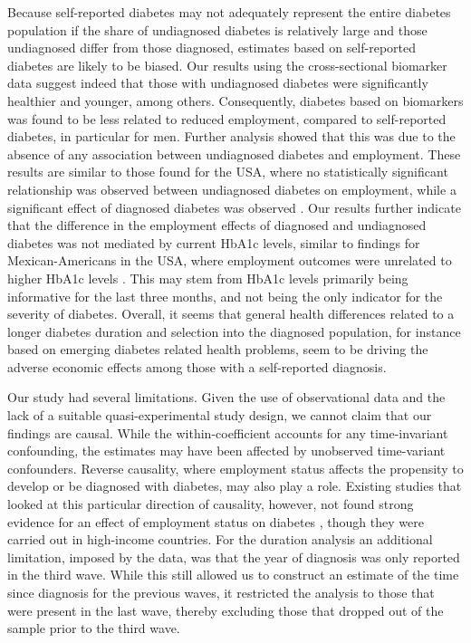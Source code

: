 \documentclass[10pt,letterpaper]{article}
\begin{document}
Because self-reported diabetes may not adequately represent the entire diabetes population if the share of undiagnosed diabetes is relatively large and those undiagnosed differ from those diagnosed, estimates based on self-reported diabetes are likely to be biased. Our results using the cross-sectional biomarker data suggest indeed that  those with undiagnosed diabetes were significantly healthier and younger, among others. Consequently, diabetes based on biomarkers was found to be less related to reduced employment, compared to self-reported diabetes, in particular for men. Further analysis showed that this was due to the absence of any association between undiagnosed diabetes and employment. These results are similar to those found for the USA, where no statistically significant relationship was observed between undiagnosed diabetes on employment, while a significant effect of diagnosed diabetes was observed \cite{Minor2015}. Our results further indicate that the  difference in the employment effects of diagnosed and undiagnosed diabetes was not mediated by current \ac{HbA1c} levels, similar to findings for Mexican-Americans in the USA, where employment outcomes were unrelated to higher \ac{HbA1c} levels \cite{BrownIII2011}. This may stem from \ac{HbA1c} levels primarily being informative for the last three months, and not being the only indicator for the severity of diabetes. Overall, it seems that general health differences related to a longer diabetes duration and selection into the diagnosed population, for instance based on emerging diabetes related health problems, seem to be driving the adverse economic effects among those with a self-reported diagnosis.

Our study had several limitations. Given the use of observational data and the lack of a suitable quasi-experimental study design, we cannot claim that our findings are causal. While the within-coefficient accounts for any time-invariant confounding, the estimates may have been affected by unobserved time-variant confounders. Reverse causality, where employment status affects the propensity to develop or be diagnosed with diabetes, may also play a role. Existing studies that looked at this particular direction of causality, however, not found strong evidence for an effect of employment status on diabetes \cite{Bergemann2011,Schaller2015}, though they were carried out in high-income countries. For the duration analysis an additional limitation, imposed by the data, was that the year of diagnosis was only reported in the third wave. While this still allowed us to construct an estimate of the time since diagnosis for the previous waves, it restricted the analysis to those that were present in the last wave, thereby excluding those that dropped out of the sample prior to the third wave. 
\end{document}
